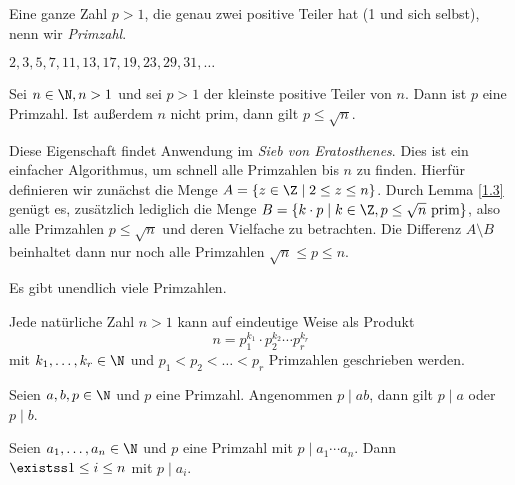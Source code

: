 \begin{defn*}[Primzahl]\video
	Eine ganze Zahl $p > 1$, die genau zwei positive Teiler hat (1 und sich selbst), nenn wir \emph{Primzahl}.
\end{defn*}

\begin{exmp*}
	\( 2,3,5,7,11,13,17,19,23,29,31,\dotsc \)
\end{exmp*}

\begin{lem}\autolabel
	Sei $n \in \N, n > 1$ und sei $p>1$ der kleinste positive Teiler von $n$. Dann ist $p$ eine Primzahl. Ist außerdem $n$ nicht prim, dann gilt $p \leq \sqrt{n}$.
\end{lem}

\begin{rem*}
	Diese Eigenschaft findet Anwendung im \emph{Sieb von Eratosthenes}. Dies ist ein einfacher Algorithmus, um schnell alle Primzahlen bis $n$ zu finden. Hierfür definieren wir zunächst die Menge \( A = \{z \in \Z \mid 2 \leq z \leq n\} \). Durch Lemma \ref{1.3} genügt es, zusätzlich lediglich die Menge $B = \{k \cdot p \mid k \in \Z, p \leq \sqrt{n} \ \text{prim}\}$, also alle Primzahlen $p \leq \sqrt{n}$ und deren Vielfache zu betrachten. Die Differenz $A \setminus B$ beinhaltet dann nur noch alle Primzahlen $\sqrt{n} \leq p \leq n$.
\end{rem*}

\begin{thm}[Euklid]\autolabel
	Es gibt unendlich viele Primzahlen.
\end{thm}

\begin{thm}\autolabel
	Jede natürliche Zahl $n > 1$ kann auf eindeutige Weise als Produkt
	\[ n = p_1^{k_1} \cdot p_2^{k_2} \dotsm p_r^{k_r} \]
	mit $k_1, \dotsc, k_r \in \N$ und $p_1 < p_2 < \dots < p_r$ Primzahlen geschrieben werden.
\end{thm}

\begin{lem}\video\autolabel
	Seien \( a,b, p \in \N \) und $p$ eine Primzahl. Angenommen $p \mid ab$, dann gilt $p \mid a$ oder $p \mid b$.
\end{lem}

\begin{cor}\autolabel
	Seien $a_1,\dotsc,a_n \in \N$ und $p$ eine Primzahl mit $p \mid a_1 \dotsm a_n$. Dann $\existss 1 \leq i \leq n$ mit $p \mid a_i$.
\end{cor}

